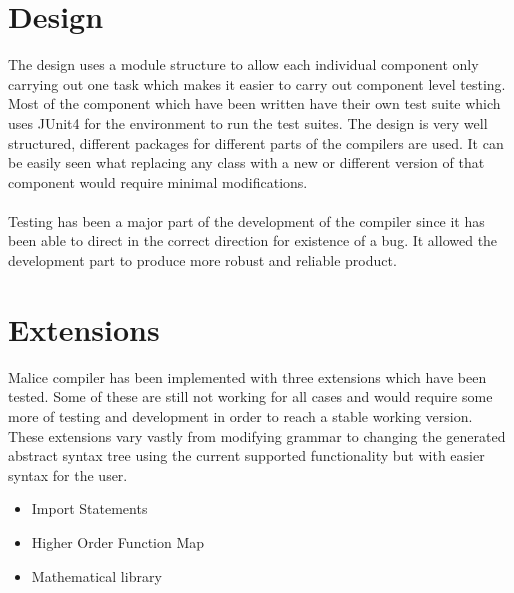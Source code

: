 \documentclass[a4wide, 11pt]{article}
\begin{document}
		
\section{Design}
	The design uses a module structure to allow each individual component only carrying out one task which makes it easier to carry out
	component level testing. Most of the component which have been written have their own test suite which uses JUnit4 for the 
	environment to run the test suites. The design is very well structured, different packages for different parts of the 
	compilers are used. It can be easily seen what replacing any class with a new or different version of that component would require
	minimal modifications.
	\\
	\\
	Testing has been a major part of the development of the compiler since it has been able to direct in the correct direction
	for existence of a bug. It allowed the development part to produce more robust and reliable product.

\section{Extensions}
	Malice compiler has been implemented with three extensions which have been tested. Some of these are still not working for all cases 
	and would require some more of testing and development in order to reach a stable working version. These extensions vary vastly from
	modifying grammar to changing the generated abstract syntax tree using the current supported functionality but with easier syntax for 
	the user.
	\begin{itemize}
		\item Import Statements
		\item Higher Order Function Map
		\item Mathematical library
	\end{itemize}
\end{document}
